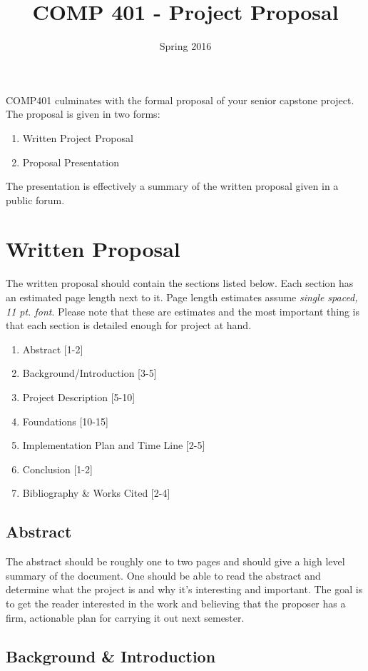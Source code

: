 \documentclass[10pt]{article}
\title{COMP 401 - Project Proposal}
\author{  }
\date{Spring 2016}
\begin{document}
\maketitle

COMP401 culminates with the formal proposal of your senior capstone project.  The proposal is given in two forms:
\begin{enumerate}
\item Written Project Proposal
\item Proposal Presentation
\end{enumerate}
The presentation is effectively a summary of the written proposal given in a public forum. 

\section{Written Proposal}

The written proposal should contain the sections listed below.  Each section has an estimated page length next to it.  Page length estimates assume \textit{single spaced, 11 pt. font}.  Please note that these are estimates and the most important thing is that each section is detailed enough for project at hand. 
\begin{enumerate}
\item Abstract [1-2]
\item Background/Introduction [3-5]
\item Project Description [5-10]
\item Foundations [10-15] 
\item Implementation Plan and Time Line [2-5]
\item Conclusion [1-2]
\item Bibliography \& Works Cited [2-4]
\end{enumerate}

\subsection{Abstract}

The abstract should be roughly one to two pages and should give a high level summary of the document.  One should be able to read the abstract and determine what the project is and why it's interesting and important.  The goal is to get the reader interested in the work and believing that the proposer has a firm, actionable plan for carrying it out next semester. 

\subsection{Background \& Introduction}
\end{document}
